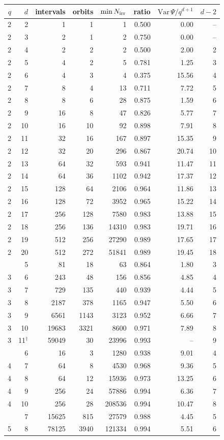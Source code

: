 \begin{tabular}{rrrrrrrr}
\toprule
$q$ & $d$ & intervals & orbits & $\min N_{\rm irr}$ & ratio & $\mathrm{Var}\,\Psi/q^{d+1}$ & $d-2$ \\
\midrule
2 & 2 & 1 & 1 & 1 & 0.500 & 0.00 & -- \\
2 & 3 & 2 & 1 & 2 & 0.750 & 0.00 & -- \\
2 & 4 & 2 & 2 & 2 & 0.500 & 2.00 & 2 \\
2 & 5 & 4 & 2 & 5 & 0.781 & 1.25 & 3 \\
2 & 6 & 4 & 3 & 4 & 0.375 & 15.56 & 4 \\
2 & 7 & 8 & 4 & 13 & 0.711 & 7.72 & 5 \\
2 & 8 & 8 & 6 & 28 & 0.875 & 1.59 & 6 \\
2 & 9 & 16 & 8 & 47 & 0.826 & 5.77 & 7 \\
2 & 10 & 16 & 10 & 92 & 0.898 & 7.91 & 8 \\
2 & 11 & 32 & 16 & 167 & 0.897 & 15.35 & 9 \\
2 & 12 & 32 & 20 & 296 & 0.867 & 20.74 & 10 \\
2 & 13 & 64 & 32 & 593 & 0.941 & 11.47 & 11 \\
2 & 14 & 64 & 36 & 1102 & 0.942 & 17.37 & 12 \\
2 & 15 & 128 & 64 & 2106 & 0.964 & 11.86 & 13 \\
2 & 16 & 128 & 72 & 3952 & 0.965 & 15.22 & 14 \\
2 & 17 & 256 & 128 & 7580 & 0.983 & 13.88 & 15 \\
2 & 18 & 256 & 136 & 14310 & 0.983 & 19.71 & 16 \\
2 & 19 & 512 & 256 & 27290 & 0.989 & 17.65 & 17 \\
2 & 20 & 512 & 272 & 51841 & 0.989 & 19.45 & 18 \\
\addlinespace
3 & 5 & 81 & 18 & 63 & 0.864 & 1.80 & 3 \\
3 & 6 & 243 & 48 & 156 & 0.856 & 4.85 & 4 \\
3 & 7 & 729 & 135 & 440 & 0.939 & 4.44 & 5 \\
3 & 8 & 2187 & 378 & 1165 & 0.947 & 5.50 & 6 \\
3 & 9 & 6561 & 1143 & 3123 & 0.952 & 6.66 & 7 \\
3 & 10 & 19683 & 3321 & 8600 & 0.971 & 7.89 & 8 \\
3 & 11$^\dagger$ & 59049 & 30 & 23996 & 0.993 & -- & 9 \\
\addlinespace
4 & 6 & 16 & 3 & 1280 & 0.938 & 9.01 & 4 \\
4 & 7 & 64 & 8 & 4530 & 0.968 & 9.36 & 5 \\
4 & 8 & 64 & 12 & 15936 & 0.973 & 13.25 & 6 \\
4 & 9 & 256 & 24 & 57886 & 0.994 & 6.36 & 7 \\
4 & 10 & 256 & 28 & 208536 & 0.994 & 10.47 & 8 \\
\addlinespace
5 & 7 & 15625 & 815 & 27579 & 0.988 & 4.45 & 5 \\
5 & 8 & 78125 & 3940 & 121334 & 0.994 & 5.51 & 6 \\
\bottomrule
\end{tabular}